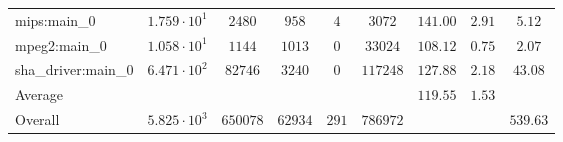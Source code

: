 \begin{tabular}{|l|c|c|c|c|c|c|c|c|}
mips:main\_0            & $ 1.759 \cdot 10^{1}  $ & $ 2480   $ & $ 958   $ & $ 4   $ & $ 3072   $ & $ 141.00      $ & $ 2.91    $ & $ 5.12    $ \\
mpeg2:main\_0           & $ 1.058 \cdot 10^{1}  $ & $ 1144   $ & $ 1013  $ & $ 0   $ & $ 33024  $ & $ 108.12      $ & $ 0.75    $ & $ 2.07    $ \\
sha\_driver:main\_0     & $ 6.471 \cdot 10^{2}  $ & $ 82746  $ & $ 3240  $ & $ 0   $ & $ 117248 $ & $ 127.88      $ & $ 2.18    $ & $ 43.08   $ \\
\hline
Average                 & $                     $ & $        $ & $       $ & $     $ & $        $ & $ 119.55      $ & $ 1.53    $ & $         $ \\
\hline
Overall                 & $ 5.825 \cdot 10^{3}  $ & $ 650078 $ & $ 62934 $ & $ 291 $ & $ 786972 $ & $             $ & $         $ & $ 539.63  $ \\
\hline
\end{tabular}
